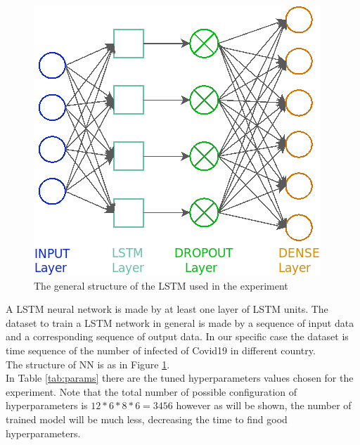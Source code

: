 \documentclass[letterpaper]{article}%
\begin{document}
\begin{figure}[!h]
	\includegraphics[width=\columnwidth]{img/LSTM}
	\caption{The general structure of the LSTM used in the experiment}
	\label{fig:LSTM}
\end{figure}
A LSTM neural network is made by at least one layer of LSTM units. The dataset to train a LSTM network in general is made by a sequence of input data and a corresponding sequence of output data.
In our specific case the dataset is time sequence of the number of infected of Covid19 in different country.\\ The structure of NN is as in Figure \ref{fig:LSTM}.\\ 
In Table \ref{tab:params} there are the tuned hyperparameters values chosen for the experiment. Note that the total number of possible configuration of hyperparameters is $ 12*6*8*6 = 3456 $ however as will be shown, the number of trained model will be much less, decreasing the time to find good hyperparameters.\\
\end{document}
